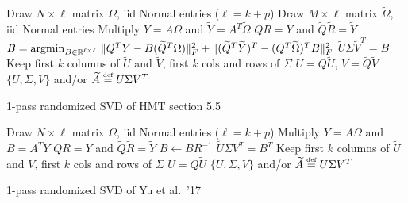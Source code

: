 \documentclass[10pt, letterpaper]{scrartcl}
\begin{document}
\begin{algorithm}
    \begin{algorithmic}[1]
          
        \State Draw $N \times \ell$ matrix $\Omega$, iid Normal entries ($\ell = k+p$)
        \State Draw $M \times \ell$ matrix $\widetilde{\Omega}$, iid Normal entries
        \State Multiply $Y = A\Omega$ and $\widetilde{Y}=A^T\widetilde{\Omega}$ 
        \State $QR=Y$ and $\widetilde{Q}\widetilde{R}=\widetilde{Y}$ 
        \State $B = \operatorname*{argmin}_{B\in\mathbb{R}^{\ell\times \ell}}\, \| Q^TY - B (\widetilde{Q}^T\Omega)\|_F^2 + \|(\widetilde{Q}^T\widetilde{Y})^T - (Q^T\widetilde{\Omega})^T B\|_F^2$ 
        \State $\widetilde{U}\Sigma \widetilde{V}^T = B$ 
        \State Keep first $k$ columns of $\widetilde{U}$ and $\widetilde{V}$, first $k$ cols and rows of $\Sigma$
        \State $U = Q\widetilde{U}$, $V = \widetilde{Q}\widetilde{V}$
        \State \Return $\{U,\Sigma,V\}$ and/or $\widetilde{A} \stackrel{\text{\tiny def}}{=} U\Sigma V^T$
        \EndProcedure
    \end{algorithmic}
    \caption{1-pass randomized SVD of HMT section 5.5} \label{algo:2}
\end{algorithm}

\begin{algorithm}
    \begin{algorithmic}[1]
          
        \State Draw $N \times \ell$ matrix $\Omega$, iid Normal entries ($\ell = k+p$)
        \State Multiply $Y=A\Omega$ and $B = A^TY$ 
        \State $QR=Y$ and $\widetilde{Q}\widetilde{R}=\widetilde{Y}$ 
        \State $B \gets BR^{-1}$ 
        \State $\widetilde{U}\Sigma V^T = B^T$ 
        \State Keep first $k$ columns of $\widetilde{U}$ and $V$, first $k$ cols and rows of $\Sigma$
        \State $U = Q\widetilde{U}$
        \State \Return $\{U,\Sigma,V\}$ and/or $\widetilde{A} \stackrel{\text{\tiny def}}{=} U\Sigma V^T$
        \EndProcedure
    \end{algorithmic}
    \caption{1-pass randomized SVD of Yu et al.\ '17} \label{algo:3}
\end{algorithm}
\end{document}
